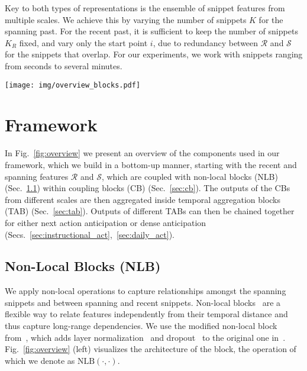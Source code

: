 \documentclass[runningheads]{llncs}
\begin{document}
Key to both types of representations is the ensemble of snippet features from multiple scales. We achieve this by varying the number of snippets $K$ for the spanning past. For the recent past, it is sufficient to keep the number of snippets $K_R$ fixed, and vary only the start point $i$, due to redundancy between $\mathcal{R}$ and $\mathcal{S}$ for the snippets that overlap. For our experiments, we work with snippets ranging from seconds to several minutes.

\begin{figure*}[!t] 
\centering 
\texttt{[image: img/overview\_blocks.pdf]} 
\caption{Model components: Non-Local Blocks (NLB) compute interactions between two representations via attention (Sec.~\ref{sec:nlb}). Two such NLBs are combined in a Coupling Block (CB), which calculates the attention-reweighted spanning and recent representations (Sec.~\ref{sec:cb}). We couple each recent with all spanning representations via individual CBs and combine their outputs in a Temporal Aggregation Block (TAB) (Sec.~\ref{sec:tab}). The outputs of multiple such TABs are combined to perform anticipation,  Fig.~\ref{fig:overview_new}.}
\label{fig:overview} 
\end{figure*} 

\section{Framework}
In Fig.~\ref{fig:overview} we present an overview of the components used in our framework, which we build in a bottom-up manner, starting with the recent and spanning features $\mathcal{R}$ and $\mathcal{S}$, which are coupled with non-local blocks (NLB) (Sec.~\ref{sec:nlb}) within coupling blocks (CB) (Sec.~\ref{sec:cb}). The outputs of the CBs from different scales are then aggregated inside temporal aggregation blocks (TAB) (Sec.~\ref{sec:tab}). Outputs of different TABs can then be chained together for either next action anticipation or dense anticipation (Secs.~\ref{sec:instructional_act},~\ref{sec:daily_act}).

\subsection{Non-Local Blocks (NLB)}\label{sec:nlb} 
We apply non-local operations to capture relationships amongst the spanning snippets and between spanning and recent snippets. Non-local blocks~\cite{wang2018non} are a flexible way to relate features independently from their temporal distance and thus capture long-range dependencies. We use the modified non-local block from~\cite{lfb2019}, which adds layer normalization~\cite{ba2016layer} and dropout~\cite{srivastava2014dropout} to the original one in~\cite{wang2016temporal}.   Fig.~\ref{fig:overview} (left) visualizes the architecture of the block, the operation of which we denote as $\text{NLB}(\cdot,\cdot)$.
\end{document}
